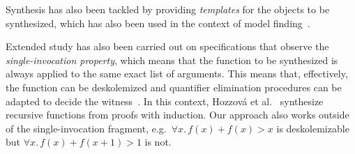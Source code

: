 \documentclass[runningheads]{llncs}
\newcommand{\sygus}{SyGuS\xspace}
\begin{document}
Synthesis has also been tackled by providing \emph{templates} for the objects to
be synthesized, which has also been used in the context of model
finding~\cite{BrownJO24,elad2024infinite,BrownCJOR25}. 

Extended study has also been carried out on specifications that observe the
\emph{single-invocation property}, which means that the function to be
synthesized is always applied to the same exact list of arguments. This means
that, effectively, the function can be deskolemized and quantifier elimination
procedures can be adapted to  decide the
witness~\cite{kuncak-pldi10,kuncak-sttt13,hozzova-fmcad25}.  In this context,
Hozzová et al.~\cite{hozzova-ijcar24} synthesize recursive functions from proofs
with induction. Our approach also works outside of the single-invocation
fragment, e.g.\
$\forall x.\,f(x)+f(x)>x$ is deskolemizable but $\forall x.\,f(x)+f(x+1)>1$ is not.






\end{document}
